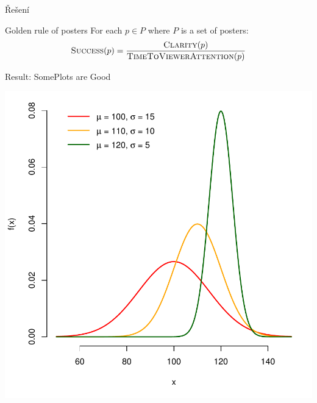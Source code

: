 \documentclass[portrait,a0paper,fontscale=0.25]{baposter}
\begin{document}
\begin{poster}
\begin{posterbox}[column=0, name=something1, below=goals]{Řešení}

\end{posterbox}

\begin{posterbox}[column=0, name=something2, below=something1, headerColorOne=yellow!80!orange!95!black, boxColorOne=yellow!33]{Golden rule of posters}
For each $p \in P$ where $P$ is a set of posters:
$$ \textsc{Success}(p) = \frac{\textsc{Clarity}(p)}{\textsc{TimeToViewerAttention}(p)} $$
\end{posterbox}

%
%


%
%
%

\begin{posterbox}[column=1, name=result1]{Result: SomePlots are Good}
\begin{center}
\includegraphics[width=0.7\linewidth]{img/ukazka-obr02.pdf}
\end{center}


\end{posterbox}
\end{poster}
\end{document}
